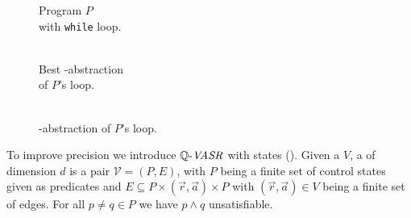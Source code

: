 \begin{minipage}[t]{0.3\linewidth} \centering
	\begin{figure}[H]
		
		\caption{Program $P$ \\ with \texttt{while} loop.}
	\end{figure}
\end{minipage}
\begin{minipage}[t]{0.35\linewidth} \centering
	\begin{figure}[H]
			
			\caption{\\ Best \qvasr-abstraction \\ of $P$'s loop.}
	\end{figure}
\end{minipage}
\begin{minipage}[t]{0.3\linewidth} \centering
	\begin{figure}[H]
		
		\caption{\\ \qvasrs-abstraction of $P$'s loop.}
	\end{figure}
\end{minipage}

To improve precision we introduce $\mathit{\mathbb{Q} \text{-}VASR}$ with states (\qvasrs). Given a \qvasr $V$, a \qvasrs of dimension $d$ is a pair $\mathcal{V} = (P, E)$, with $P$ being a finite set of control states given as predicates and $E \subseteq P \times (\vec{r}, \vec{a}) \times P$ with $(\vec{r}, \vec{a}) \in V$ being a finite set of edges. For all $p \neq q \in P$ we have $p \land q$ unsatisfiable.
